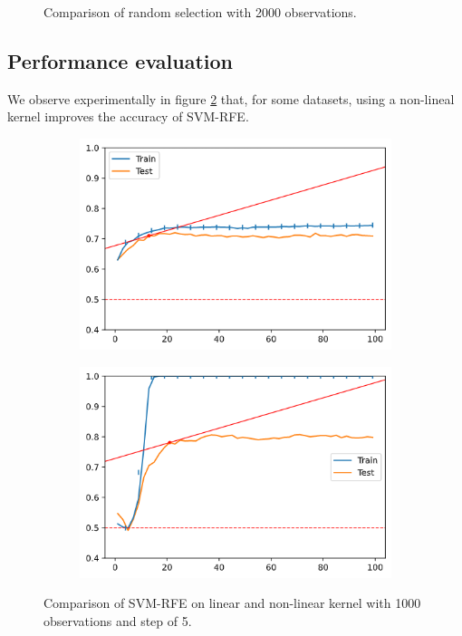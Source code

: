 \begin{figure}[H]
\begin{subfigure}[b]{0.32\linewidth}
    \end{subfigure}
    \caption{Comparison of random selection with 2000 observations.}
    \label{fig:ch5.kernel.cmp1}
\end{figure}

\subsection*{Performance evaluation}

We observe experimentally in figure \ref{fig:ch5.kernel.cmp2} that, for some datasets, using a non-lineal kernel improves the accuracy of SVM-RFE.

\begin{figure}[H]
    \centering
    \begin{subfigure}[b]{0.4\linewidth}
        \includegraphics[width=\linewidth]{img/art_linear.png}
    \end{subfigure}
    \begin{subfigure}[b]{0.4\linewidth}
        \includegraphics[width=\linewidth]{img/art_poly.png}
    \end{subfigure}
    \caption{Comparison of SVM-RFE on linear and non-linear kernel with 1000 observations and step of 5.}
    \label{fig:ch5.kernel.cmp2}
\end{figure}


